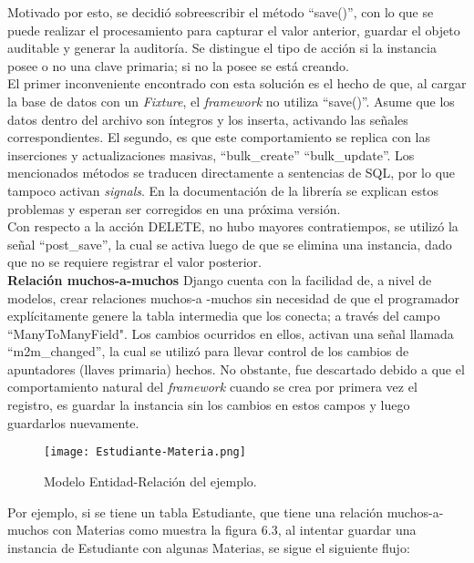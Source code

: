 Motivado por esto, se decidió sobreescribir el método “save()”, con lo que se puede realizar el procesamiento para capturar el valor anterior, guardar el objeto auditable y generar la auditoría. Se distingue el tipo de acción si la instancia posee o no una clave primaria; si no la posee se está creando.\\

El primer inconveniente encontrado con esta solución es el hecho de que, al cargar la base de datos con un \textit{Fixture}, el \textit{framework} no utiliza “save()”. Asume que los datos dentro del archivo son íntegros y los inserta, activando las señales correspondientes. El segundo, es que este comportamiento se replica con las inserciones y actualizaciones masivas, “bulk\_create” “bulk\_update”. Los mencionados métodos se traducen directamente a sentencias de SQL, por lo que tampoco activan \textit{signals}.  En la documentación de la librería se explican estos problemas y esperan ser corregidos en una próxima versión.\\

Con respecto a la acción DELETE, no hubo mayores contratiempos, se utilizó la señal “post\_save”, la cual se activa luego de que se elimina una instancia, dado que no se requiere registrar el valor posterior.\\


\textbf{Relación muchos-a-muchos} Django cuenta con la facilidad de, a nivel de modelos, crear relaciones muchos-a -muchos sin necesidad de que el programador explícitamente genere la tabla intermedia que los conecta; a través del campo “ManyToManyField". Los cambios ocurridos en ellos, activan una señal llamada “m2m\_changed”, la cual se utilizó para llevar control de los cambios de apuntadores (llaves primaria) hechos. No obstante, fue descartado debido a que el comportamiento natural del \textit{framework} cuando se crea por primera vez el registro, es guardar la instancia sin los cambios en estos campos y luego guardarlos nuevamente.\\

\begin{figure}[h]
\centering
\texttt{[image: Estudiante-Materia.png]}
\caption{Modelo Entidad-Relación del ejemplo.}
\label{fig:figura6.3}
\end{figure}

Por ejemplo, si se tiene un tabla Estudiante, que tiene una relación muchos-a-muchos con Materias como muestra la figura 6.3, al intentar guardar una instancia de Estudiante con algunas Materias, se sigue el siguiente flujo:\\

